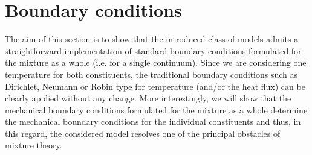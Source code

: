 \documentclass[a4paper]{article}
\begin{document}
\section{Boundary conditions} \label{sec:9}
The aim of this section is to show that the introduced class of models admits a straightforward implementation of standard boundary conditions formulated for the mixture as a whole (i.e. for a single continuum). Since we are considering one temperature for both constituents, the traditional boundary conditions such as Dirichlet, Neumann or Robin type for temperature (and/or the heat flux) can be clearly applied without any change. More interestingly, we will show that the mechanical boundary conditions formulated for the mixture as a whole determine the  mechanical boundary conditions for the individual constituents and thus, in this regard, the considered model resolves one of the principal obstacles of mixture theory. 
\end{document}
